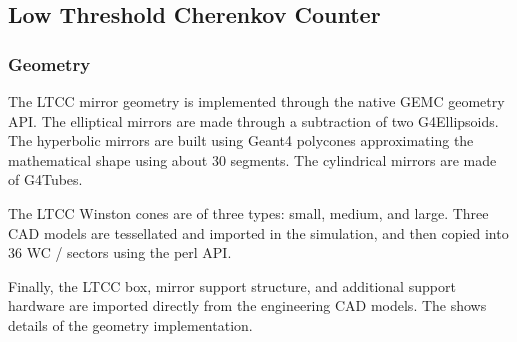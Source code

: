 \subsection{Low Threshold Cherenkov Counter}

\subsubsection{Geometry}
The LTCC mirror geometry is implemented through the native GEMC geometry API. The elliptical mirrors are made through a subtraction of
two G4Ellipsoids. The hyperbolic mirrors are built using Geant4 polycones approximating the mathematical shape using about 30 segments.
The cylindrical mirrors are made of G4Tubes.

The LTCC Winston cones are of three types: small, medium, and large. Three CAD models are tessellated and imported in the simulation, and
then copied into 36 WC / sectors using the perl API.

Finally, the LTCC box, mirror support structure, and additional support hardware are imported directly from the engineering CAD models.
The  shows details of the geometry implementation.

